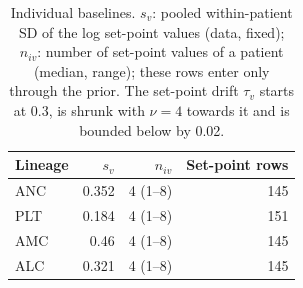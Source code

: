\begin{table}[!htbp]
\centering
\small
\setlength{\tabcolsep}{3.5pt}
\caption{Individual baselines. $s_v$: pooled within-patient SD of the log set-point values (data, fixed); $n_{iv}$: number of set-point values of a patient (median, range); these rows enter only through the prior. The set-point drift $\tau_v$ starts at 0.3, is shrunk with $\nu=4$ towards it and is bounded below by 0.02.}
\label{tab:baseline}
\begin{tabular}{lrrr}
\toprule
Lineage & $s_v$ & $n_{iv}$ & Set-point rows \\
\midrule
ANC & 0.352 & 4 (1--8) & 145 \\
PLT & 0.184 & 4 (1--8) & 151 \\
AMC & 0.46 & 4 (1--8) & 145 \\
ALC & 0.321 & 4 (1--8) & 145 \\
\bottomrule
\end{tabular}
\end{table}
